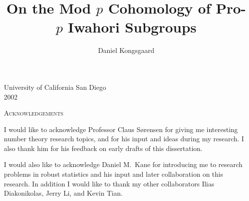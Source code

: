\documentclass[letterpaper,oneside,english,11pt,openany]{memoir}
\title{On the Mod \texorpdfstring{$p$}{p} Cohomology of Pro-\texorpdfstring{$p$}{p} Iwahori Subgroups}
\author{Daniel Kongsgaard}
\begin{document}
\DoubleSpacing


\pagestyle{empty}



\clearpage
\null
\clearpage

\frontmatter

\pagestyle{plain}

\setcounter{page}{3}



\vfill

\begin{center}
  {\large University of California San Diego} \\[1em]
  {\large 2002}
\end{center}

\clearpage

\tableofcontents

\clearpage

\printnomenclature[4cm]

\clearpage

\listoftables

\clearpage


\begin{center}
  \Large\scshape Acknowledgements
\end{center}

I would like to acknowledge Professor Claus Sørensen for giving me interesting number theory research topics, and for his input and ideas during my research. I also thank him for his feedback on early drafts of this dissertation.

I would also like to acknowledge Daniel M.\ Kane for introducing me to research problems in robust statistics and his input and later collaboration on this research. In addition I would like to thank my other collaborators Ilias Diakonikolas, Jerry Li, and Kevin Tian.

\clearpage
\end{document}
